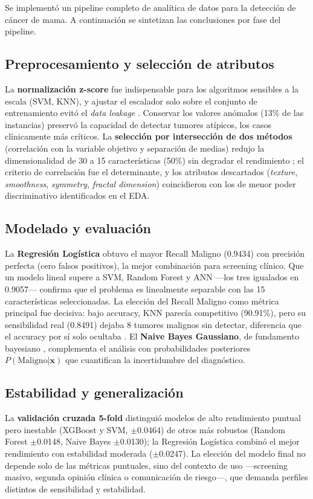\documentclass[journal]{IEEEtran}
\begin{document}
Se implementó un pipeline completo de analítica de datos para la detección de cáncer de mama. A continuación se sintetizan las conclusiones por fase del pipeline.

\subsection{Preprocesamiento y selección de atributos}
La \textbf{normalización z-score} fue indispensable para los algoritmos sensibles a la escala (SVM, KNN), y ajustar el escalador solo sobre el conjunto de entrenamiento evitó el \textit{data leakage} \cite{kantardzic, garcia2015}. Conservar los valores anómalos (13\% de las instancias) preservó la capacidad de detectar tumores atípicos, los casos clínicamente más críticos. La \textbf{selección por intersección de dos métodos} (correlación con la variable objetivo y separación de medias) redujo la dimensionalidad de 30 a 15 características (50\%) sin degradar el rendimiento \cite{remeseiro2019}; el criterio de correlación fue el determinante, y los atributos descartados (\textit{texture}, \textit{smoothness}, \textit{symmetry}, \textit{fractal dimension}) coincidieron con los de menor poder discriminativo identificados en el EDA.

\subsection{Modelado y evaluación}
La \textbf{Regresión Logística} obtuvo el mayor Recall Maligno (0.9434) con precisión perfecta (cero falsos positivos), la mejor combinación para screening clínico. Que un modelo lineal supere a SVM, Random Forest y ANN —los tres igualados en 0.9057— confirma que el problema es linealmente separable con las 15 características seleccionadas. La elección del Recall Maligno como métrica principal fue decisiva: bajo accuracy, KNN parecía competitivo (90.91\%), pero su sensibilidad real (0.8491) dejaba 8 tumores malignos sin detectar, diferencia que el accuracy por sí solo ocultaba \cite{hossin2015, sokolova2009}. El \textbf{Naive Bayes Gaussiano}, de fundamento bayesiano \cite{bayesian_med}, complementa el análisis con probabilidades posteriores $P(\text{Maligno}|\mathbf{x})$ que cuantifican la incertidumbre del diagnóstico.

\subsection{Estabilidad y generalización}
La \textbf{validación cruzada 5-fold} \cite{hastie2009} distinguió modelos de alto rendimiento puntual pero inestable (XGBoost y SVM, $\pm$0.0464) de otros más robustos (Random Forest $\pm$0.0148, Naive Bayes $\pm$0.0130); la Regresión Logística combinó el mejor rendimiento con estabilidad moderada ($\pm$0.0247). La elección del modelo final no depende solo de las métricas puntuales, sino del contexto de uso —screening masivo, segunda opinión clínica o comunicación de riesgo—, que demanda perfiles distintos de sensibilidad y estabilidad.
\end{document}
